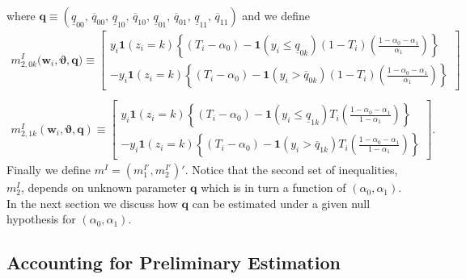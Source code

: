 where $\mathbf{q} \equiv ( \underline{q}_{00},\, \overline{q}_{00},\, \underline{q}_{10}, \,\overline{q}_{10},\, \underline{q}_{01}, \,\overline{q}_{01},\, \underline{q}_{11},\, \overline{q}_{11})$ and we define
\begin{align}
  m_{2,0k}^I\big(\mathbf{w}_i, \boldsymbol{\vartheta}, \mathbf{q}) \equiv \left[
  \begin{array}{r}
    y_i \mathbf{1}\left( z_i=k \right)\left\{(T_i - \alpha_0) - \mathbf{1}(y_i \leq \underline{q}_{0k})  (1 - T_i)\left( \frac{1 - \alpha_0 - \alpha_1}{\alpha_1} \right)\right\} \\
    - y_i \mathbf{1}(z_i=k) \left\{ (T_i - \alpha_0) -  \mathbf{1}(y_i > \overline{q}_{0k}) (1 - T_i) \left( \frac{1 - \alpha_0 - \alpha_1}{\alpha_1} \right) \right\} 
\end{array}
\right] \\\nonumber \\
  m_{2,1k}^I(\mathbf{w}_i, \boldsymbol{\vartheta}, \mathbf{q}) \equiv \left[
  \begin{array}{r}
    y_i \mathbf{1}\left( z_i=k \right)\left\{(T_i - \alpha_0) - \mathbf{1}(y_i \leq \underline{q}_{1k})  T_i\left( \frac{1 - \alpha_0 - \alpha_1}{1 - \alpha_1} \right)\right\} \\
    - y_i \mathbf{1}(z_i=k) \left\{ (T_i - \alpha_0) -  \mathbf{1}(y_i > \overline{q}_{1k}) T_i \left( \frac{1 - \alpha_0 - \alpha_1}{1 - \alpha_1} \right) \right\} 
\end{array}
\right].
\end{align}
Finally we define $m^I = (m_1^{I'}, m_2^{I'})'$.
Notice that the second set of inequalities, $m_2^I$, depends on unknown parameter $\mathbf{q}$ which is in turn a function of $(\alpha_0, \alpha_1)$.
In the next section we discuss how $\mathbf{q}$ can be estimated under a given null hypothesis for $(\alpha_0, \alpha_1)$. 


\subsection{Accounting for Preliminary Estimation}
\label{sec:prelim}


